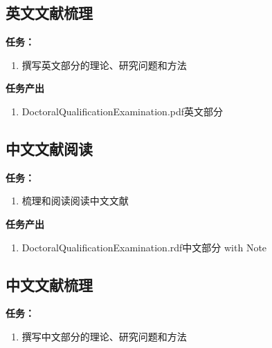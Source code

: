 \documentclass[
  12pt,
]{ctexart}
\providecommand{\tightlist}{%
  \setlength{\itemsep}{0pt}\setlength{\parskip}{0pt}}
\begin{document}
\hypertarget{ux82f1ux6587ux6587ux732eux68b3ux7406}{%
\subsection{英文文献梳理}\label{ux82f1ux6587ux6587ux732eux68b3ux7406}}

\textbf{任务：}

\begin{enumerate}
\def\labelenumi{\arabic{enumi}.}
\tightlist
\item
  撰写英文部分的理论、研究问题和方法
\end{enumerate}

\textbf{任务产出}

\begin{enumerate}
\def\labelenumi{\arabic{enumi}.}
\tightlist
\item
  DoctoralQualificationExamination.pdf英文部分
\end{enumerate}

\hypertarget{ux4e2dux6587ux6587ux732eux9605ux8bfb}{%
\subsection{中文文献阅读}\label{ux4e2dux6587ux6587ux732eux9605ux8bfb}}

\textbf{任务：}

\begin{enumerate}
\def\labelenumi{\arabic{enumi}.}
\tightlist
\item
  梳理和阅读阅读中文文献
\end{enumerate}

\textbf{任务产出}

\begin{enumerate}
\def\labelenumi{\arabic{enumi}.}
\tightlist
\item
  DoctoralQualificationExamination.rdf中文部分 with Note
\end{enumerate}

\hypertarget{ux4e2dux6587ux6587ux732eux68b3ux7406}{%
\subsection{中文文献梳理}\label{ux4e2dux6587ux6587ux732eux68b3ux7406}}

\textbf{任务：}

\begin{enumerate}
\def\labelenumi{\arabic{enumi}.}
\tightlist
\item
  撰写中文部分的理论、研究问题和方法
\end{enumerate}
\end{document}
